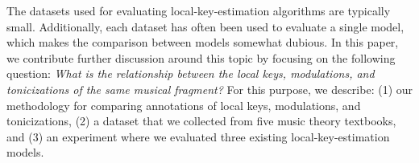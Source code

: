 
The datasets used for evaluating local-key-estimation algorithms are typically small.
Additionally, each dataset has often been used to evaluate a single model, which makes the comparison between models somewhat dubious.
In this paper, we contribute further discussion around this topic by focusing on the following question: \emph{What is the relationship between the local keys, modulations, and tonicizations of the same musical fragment?}
For this purpose, we describe: (1) our methodology for comparing annotations of local keys, modulations, and tonicizations, (2) a dataset that we collected from five music theory textbooks, and (3) an experiment where we evaluated three existing local-key-estimation models.
